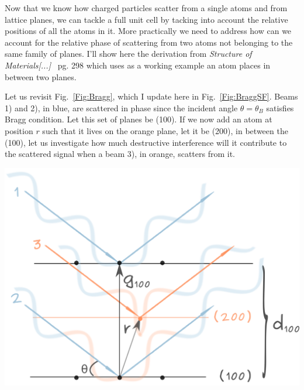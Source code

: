 Now that we know how charged particles scatter from a single atoms and from lattice planes, we can tackle a full unit cell by tacking into account the relative positions of all the atoms in it. More practically we need to address how can we account for the relative phase of scattering from two atoms not belonging to the same family of planes. I'll show here the derivation from \textit{Structure of Materials[...]}~\cite{SoM} pg. 298 which uses as a working example an atom places in between two planes. 


\noindent \begin{minipage}{0.43\textwidth}
Let us revisit Fig.~\ref{Fig:Bragg}, which I update here in Fig.~\ref{Fig:BraggSF}. Beams 1) and 2), in blue, are scattered in phase since the incident angle $\theta = \theta_B$ satisfies Bragg condition. Let this set of planes be \hkl(100). If we now add an atom at position $r$ such that it lives on the orange plane, let it be \hkl(200), in between the \hkl(100),  let us investigate how much destructive interference will it contribute to the scattered signal when a beam 3), in orange, scatters from it.
\end{minipage} %
\begin{minipage}{0.6\textwidth}
\centering
\includegraphics[width=0.87\linewidth]{Figures/BraggSF.png}
\label{Fig:BraggSF}
\end{minipage}

\vspace{0.3cm}

